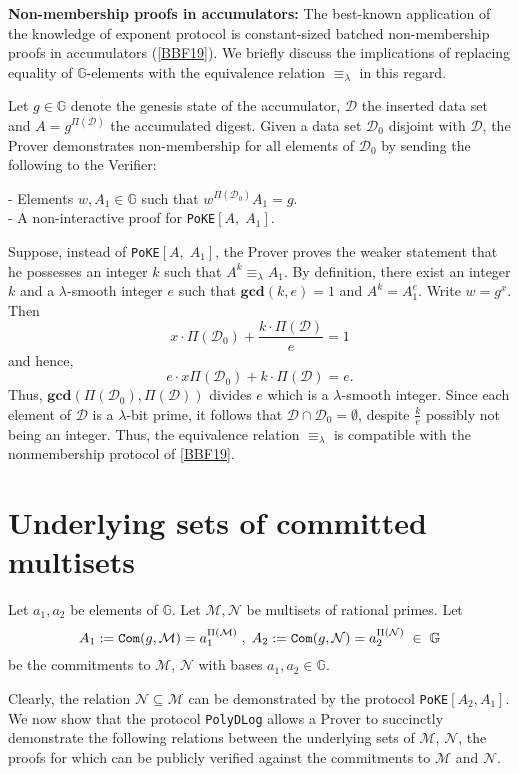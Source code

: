 \documentclass[11pt, lettersize, notitlepage, leqno, footskip=0.6cm]{article}
\newcommand{\ttt}{\texttt}
\newcommand{\bG}{\mathbb{G}}
\newcommand{\eqlam}{\equiv_{\lam}}
\newcommand{\mc}{\mathcal}
\newcommand{\mb}{\mathbb}
\newcommand{\mbf}{\mathbf}
\newcommand{\lam}{\lambda}
\newcommand{\sub}{\subseteq}
\newcommand{\vs}{\vspace{-0.15cm}}
\newcommand{\noin}{\noindent}
\newcommand{\GCD}{\mbf{gcd}}
\numberwithin{equation}{section}
\begin{document}
{{{\noin \textbf{Non-membership proofs in accumulators:} The  best-known application of the knowledge of exponent protocol is constant-sized batched non-membership proofs in accumulators (\hyperlink{BBF19}{[BBF19]}). We briefly discuss the implications of replacing equality of $\mb{G}$-elements with the equivalence relation $\eqlam$ in this regard. 

Let $g \in \mb{G}$ denote the genesis state of the accumulator, $\mc{D}$ the inserted data set and $A = g^{\Pi(\mc{D})}$ the accumulated digest. Given a data set $\mc{D}_0$ disjoint with $\mc{D}$, the Prover demonstrates non-membership for all elements of $\mc{D}_0$ by sending the following to the Verifier:

\noin - Elements $w, A_1\in\mb{G}$ such that $w^{\Pi(\mc{D}_0)}A_1 = g$.\\
- A non-interactive proof for \verb|PoKE|$[A,\; A_1]$.

Suppose, instead of \verb|PoKE|$[A,\; A_1]$, the Prover proves the weaker statement that he possesses an integer $k$ such that $A^k \eqlam A_1$. By definition, there exist an integer $k$ and a $\lam$-smooth integer $e$ such that $\GCD(k,e) = 1$ and $A^{k} = A_1^e$. Write $w = g^x$. Then \vs $$ x\cdot  \Pi(\mc{D}_0) +  \frac{k\cdot\Pi(\mc{D})}{e} = 1 $$ and hence, \vs $$e\cdot x \Pi(\mc{D}_0) +  k\cdot\Pi(\mc{D}) = e .$$ Thus, $\GCD(\Pi(\mc{D}_0), \Pi(\mc{D}))$ divides $e$ which is a $\lam$-smooth integer. Since each element of $\mc{D}$ is a $\lam$-bit prime, it follows that $\mc{D}\cap \mc{D}_0 = \emptyset$, despite $\frac{k}{e}$ possibly not being an integer. Thus, the equivalence relation $\eqlam$ is compatible with the nonmembership protocol of \hyperlink{BBF19}{[BBF19]}.



\section{\fontsize{11}{11}\selectfont Underlying sets of committed multisets}

\noin \hypertarget{Sets}{Let $a_1,a_2$ be elements of $\mb{G}$. Let $\mc{M} , \mc{N}$ be multisets of rational primes.} Let \vs $$A_1:= \ttt{Com}(g, \mc{M}) =  a_1^{\Pi(\mc{M})}\;,\; A_2:= \ttt{Com}(g, \mc{N}) = a_2^{\Pi(\mc{N})}\;\in\;\bG \vs $$ be the commitments to $\mc{M}$, $\mc{N}$ with bases $a_1, a_2\in \bG$.

Clearly, the relation $\mc{N}\sub \mc{M}$ can be demonstrated by the protocol \verb|PoKE|$[A_2, A_1]$. We now show that the protocol \verb|PolyDLog| allows a Prover to succinctly demonstrate the following relations between the underlying sets of $\mc{M}$, $\mc{N}$, the proofs for which can be publicly verified against the commitments to $\mc{M}$ and $\mc{N}$.\vspace{0.1cm}

}}}
\end{document}
